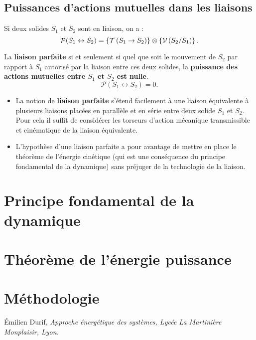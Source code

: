 \documentclass[10pt,fleqn]{article} %
\begin{document}
\subsection{Puissances d'actions mutuelles dans les liaisons}
\begin{defi}
Si deux solides $S_1$ et $S_2$ sont en liaison, on a :
$$
\mathcal{P}(S_1 \leftrightarrow S_2) = \left\{\mathcal{T} \left(S_1\rightarrow S_2 \right) \right\}\otimes \left\{\mathcal{V} \left(S_2/S_1 \right) \right\}.
$$

La \textbf{liaison parfaite} si et seulement si quel que soit le mouvement de $S_2$ par rapport à $S_1$ autorisé par la liaison entre ces deux solides, la \textbf{puissance des actions mutuelles entre $S_1$ et $S_2$ est nulle}.
$$
\mathcal{P}(S_1 \leftrightarrow S_2)=0.
$$
\end{defi}


\begin{rem}%
\begin{itemize}
\item La notion de \textbf{liaison parfaite} s'étend facilement à une liaison équivalente à plusieurs liaisons placées en parallèle et en série entre deux solide $S_1$ et $S_2$. Pour cela il suffit de considérer les torseurs d'action mécanique transmissible et cinématique de la liaison équivalente.
\item L'hypothèse d'une liaison parfaite a pour avantage de mettre en place le théorème de l'énergie cinétique (qui est une conséquence du principe fondamental de la dynamique) sans préjuger de la technologie de la liaison.
\end{itemize}
\end{rem}%


\section{Principe fondamental de la dynamique}

\section{Théorème de l'énergie puissance}

\section{Méthodologie}





\begin{thebibliography}{2}
    Émilien Durif, {\it Approche énergétique des systèmes, Lycée La Martinière Monplaisir, Lyon.}
\end{thebibliography}
\end{document}

